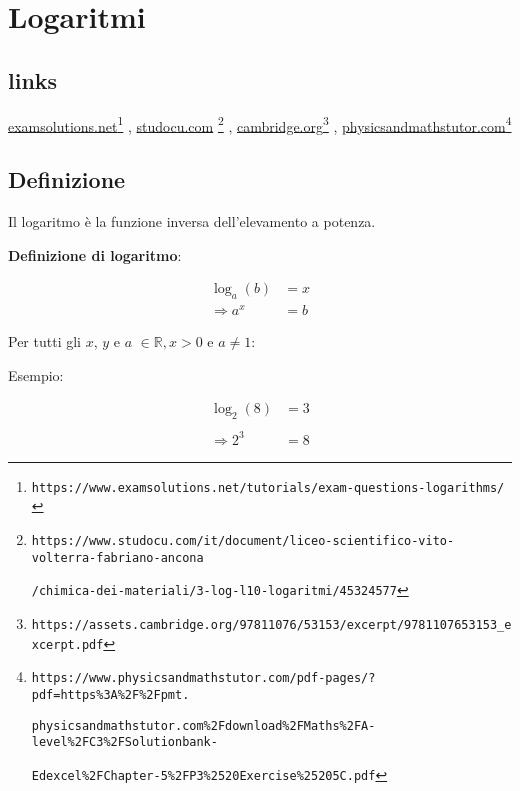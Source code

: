 \section{Logaritmi}

\subsection{links}

\href{https://www.examsolutions.net/tutorials/exam-questions-logarithms/}{examsolutions.net}\footnote{\texttt{https://www.examsolutions.net/tutorials/exam-questions-logarithms/}}
, \href{https://www.studocu.com/it/document/liceo-scientifico-vito-volterra-fabriano-ancona/chimica-dei-materiali/3-log-l10-logaritmi/45324577}{studocu.com} \footnote{\texttt{https://www.studocu.com/it/document/liceo-scientifico-vito-volterra-fabriano-ancona} 

\texttt{/chimica-dei-materiali/3-log-l10-logaritmi/45324577}}
, \href{https://assets.cambridge.org/97811076/53153/excerpt/9781107653153\_excerpt.pdf}{cambridge.org}\footnote{\texttt{https://assets.cambridge.org/97811076/53153/excerpt/9781107653153\_excerpt.pdf}}
, \href{https://www.physicsandmathstutor.com/pdf-pages/?pdf=https\%3A\%2F\%2Fpmt.physicsandmathstutor.com\%2Fdownload\%2FMaths\%2FA-level\%2FC3\%2FSolutionbank-Edexcel\%2FChapter-5\%2FP3\%2520Exercise\%25205C.pdf}{physicsandmathstutor.com}\footnote{\texttt{https://www.physicsandmathstutor.com/pdf-pages/?pdf=https\%3A\%2F\%2Fpmt.}

\texttt{physicsandmathstutor.com\%2Fdownload\%2FMaths\%2FA-level\%2FC3\%2FSolutionbank-}

\texttt{Edexcel\%2FChapter-5\%2FP3\%2520Exercise\%25205C.pdf}}


\subsection{Definizione}

Il logaritmo è la funzione inversa dell'elevamento a potenza.

\textbf{Definizione di logaritmo}:

\[
\begin{split}
\log_a(b)&=x \\
\Rightarrow
a^x&=b
\end{split}
\]

Per tutti gli $x$, $y$ e $a$ $ \in \mathbb{R}, x>0$ e $a \neq 1$:

Esempio:

\[
\begin{split}
\log_2(8)&=3 \\
\\
\Rightarrow 2^3&=8
\end{split}
\]

